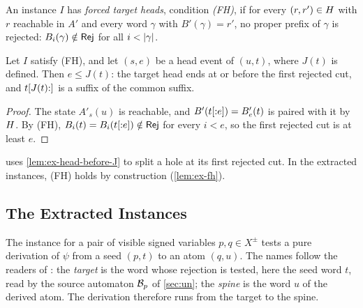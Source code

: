 

\begin{definition}\label{def:ex-fh}
An instance $I$ has \emph{forced target heads}, condition \emph{(FH)}, if for
every $(r,r')\in H$ with $r$ reachable in $A'$ and every word $\gamma$ with
$B'(\gamma)=r'$, no proper prefix of $\gamma$ is rejected:
$B_i(\gamma)\notin\mathsf{Rej}$ for all $i<\lvert \gamma\rvert$.
\end{definition}

\begin{lemma}\label{lem:ex-head-before-J}
Let $I$ satisfy (FH), and let $(s,e)$ be a head event of $(u,t)$, where $J(t)$
is defined. Then $e\le J(t)$: the target head ends at or before the first
rejected cut, and $t[J(t){:}]$ is a suffix of the common suffix.
\end{lemma}

\begin{proof}
The state $A'_s(u)$ is reachable, and $B'(t[{:}e])=B'_e(t)$ is paired with
it by $H$. By (FH), $B_i(t)=B_i(t[{:}e])\notin\mathsf{Rej}$ for every $i<e$, so the
first rejected cut is at least $e$.
\end{proof}

 uses \cref{lem:ex-head-before-J} to split a hole at its first
rejected cut. In the extracted instances, (FH) holds by construction
(\cref{lem:ex-fh}).

\subsection{The Extracted Instances}\label{sec:ex-instances}

The instance for a pair of visible signed variables $p,q\in X^\pm$ tests a
pure derivation of $\psi$ from a seed $(p,t)$ to an atom $(q,u)$. The names
follow the readers of \citet{Zhao26}: the \emph{target} is the word whose rejection
is tested, here the seed word $t$, read by the source automaton $\mathcal B_p$ of
\cref{sec:un}; the \emph{spine} is the word $u$ of the derived atom. The
derivation therefore runs from the target to the spine.

